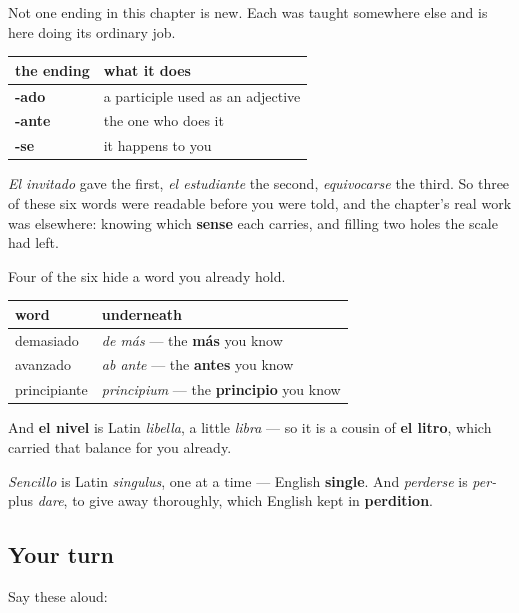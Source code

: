 \begin{grammarlens}[title={Grammar Lens: three endings, all of them already yours}]
Not one ending in this chapter is new. Each was taught somewhere else and is here doing its ordinary job.

\noindent
\begin{tabularx}{\linewidth}{@{}>{\raggedright\arraybackslash}X>{\raggedright\arraybackslash}X@{}}
\toprule
\textbf{the ending} & \textbf{what it does} \\
\midrule
\textbf{-ado} & a participle used as an adjective \\
\textbf{-ante} & the one who does it \\
\textbf{-se} & it happens to you \\
\bottomrule
\end{tabularx}

\emph{El invitado} gave the first, \emph{el estudiante} the second, \emph{equivocarse} the third. So three of these six words were readable before you were told, and the chapter's real work was elsewhere: knowing which \textbf{sense} each carries, and filling two holes the scale had left.
\end{grammarlens}

\begin{cousinweb}
Four of the six hide a word you already hold.

\noindent
\begin{tabularx}{\linewidth}{@{}>{\raggedright\arraybackslash}X>{\raggedright\arraybackslash}X@{}}
\toprule
\textbf{word} & \textbf{underneath} \\
\midrule
demasiado & \emph{de más} — the \textbf{más} you know \\
avanzado & \emph{ab ante} — the \textbf{antes} you know \\
principiante & \emph{principium} — the \textbf{principio} you know \\
\bottomrule
\end{tabularx}

And \textbf{el nivel} is Latin \emph{libella}, a little \emph{libra} — so it is a cousin of \textbf{el litro}, which carried that balance for you already.

\emph{Sencillo} is Latin \emph{singulus}, one at a time — English \textbf{single}. And \emph{perderse} is \emph{per-} plus \emph{dare}, to give away thoroughly, which English kept in \textbf{perdition}.
\end{cousinweb}

\subsection*{Your turn}
Say these aloud:

